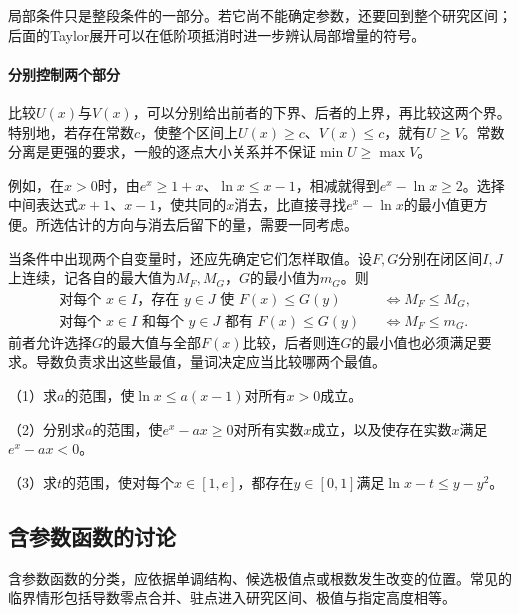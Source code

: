 局部条件只是整段条件的一部分。若它尚不能确定参数，还要回到整个研究区间；后面的Taylor展开可以在低阶项抵消时进一步辨认局部增量的符号。

\paragraph{分别控制两个部分} \mbox{}

比较\(U(x)\)与\(V(x)\)，可以分别给出前者的下界、后者的上界，再比较这两个界。特别地，若存在常数\(c\)，使整个区间上\(U(x)\ge c\)、\(V(x)\le c\)，就有\(U\ge V\)。常数分离是更强的要求，一般的逐点大小关系并不保证\(\min U\ge\max V\)。

例如，在\(x>0\)时，由\(e^x\ge1+x\)、\(\ln x\le x-1\)，相减就得到\(e^x-\ln x\ge2\)。选择中间表达式\(x+1\)、\(x-1\)，使共同的\(x\)消去，比直接寻找\(e^x-\ln x\)的最小值更方便。所选估计的方向与消去后留下的量，需要一同考虑。

当条件中出现两个自变量时，还应先确定它们怎样取值。设\(F,G\)分别在闭区间\(I,J\)上连续，记各自的最大值为\(M_F,M_G\)，\(G\)的最小值为\(m_G\)。则
\begin{equation*}
 \begin{aligned}
 &\text{对每个 }x\in I\text{，存在 }y\in J\text{ 使 }F(x)\le G(y)
 &&\Longleftrightarrow M_F\le M_G,\\
 &\text{对每个 }x\in I\text{ 和每个 }y\in J\text{ 都有 }F(x)\le G(y)
 &&\Longleftrightarrow M_F\le m_G.
 \end{aligned}
\end{equation*}
前者允许选择\(G\)的最大值与全部\(F(x)\)比较，后者则连\(G\)的最小值也必须满足要求。导数负责求出这些最值，量词决定应当比较哪两个最值。

\begin{exercise}
\mbox{}\par\nobreak

（1）求\(a\)的范围，使\(\ln x\le a(x-1)\)对所有\(x>0\)成立。

（2）分别求\(a\)的范围，使\(e^x-ax\ge0\)对所有实数\(x\)成立，以及使存在实数\(x\)满足\(e^x-ax<0\)。

（3）求\(t\)的范围，使对每个\(x\in[1,e]\)，都存在\(y\in[0,1]\)满足\(\ln x-t\le y-y^2\)。
\end{exercise}

\subsection{含参数函数的讨论}

含参数函数的分类，应依据单调结构、候选极值点或根数发生改变的位置。常见的临界情形包括导数零点合并、驻点进入研究区间、极值与指定高度相等。

